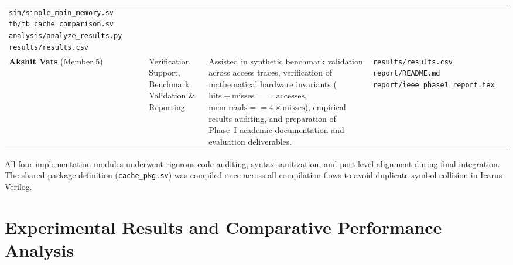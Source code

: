 \documentclass[conference]{IEEEtran}
\begin{document}
\begin{table}[htbp]
\begin{tabularx}{\textwidth}{lp{3.2cm}Xp{4.6cm}}
\texttt{sim/simple\_main\_memory.sv} \newline \texttt{tb/tb\_cache\_comparison.sv} \newline \texttt{analysis/analyze\_results.py} \newline \texttt{results/results.csv} \\
\addlinespace[0.2em]
\textbf{Akshit Vats} (Member 5) & Verification Support, Benchmark Validation \& Reporting &
Assisted in synthetic benchmark validation across access traces, verification of mathematical hardware invariants ($\text{hits} + \text{misses} == \text{accesses}$, $\text{mem\_reads} == 4 \times \text{misses}$), empirical results auditing, and preparation of Phase~I academic documentation and evaluation deliverables. &
\texttt{results/results.csv} \newline \texttt{report/README.md} \newline \texttt{report/ieee\_phase1\_report.tex} \\
\bottomrule
\end{tabularx}
\end{table}

All four implementation modules underwent rigorous code auditing, syntax sanitization, and port-level alignment during final integration. The shared package definition (\texttt{cache\_pkg.sv}) was compiled once across all compilation flows to avoid duplicate symbol collision in Icarus Verilog.

\section{Experimental Results and Comparative Performance Analysis}
\label{sec:experiments}
\end{document}
